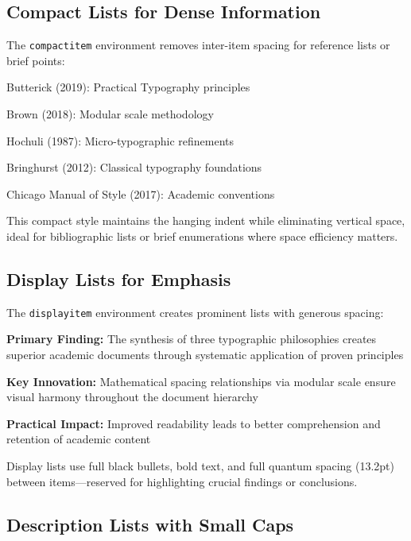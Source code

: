 \documentclass[11pt]{article}
\begin{document}
\subsection{Compact Lists for Dense Information}

The \texttt{compactitem} environment removes inter-item spacing for reference lists or brief points:

\begin{compactitem}
\item Butterick (2019): Practical Typography principles
\item Brown (2018): Modular scale methodology  
\item Hochuli (1987): Micro-typographic refinements
\item Bringhurst (2012): Classical typography foundations
\item Chicago Manual of Style (2017): Academic conventions
\end{compactitem}

This compact style maintains the hanging indent while eliminating vertical space, ideal for bibliographic lists or brief enumerations where space efficiency matters.

\subsection{Display Lists for Emphasis}

The \texttt{displayitem} environment creates prominent lists with generous spacing:

\begin{displayitem}
\item \textbf{Primary Finding:} The synthesis of three typographic philosophies creates superior academic documents through systematic application of proven principles
\item \textbf{Key Innovation:} Mathematical spacing relationships via modular scale ensure visual harmony throughout the document hierarchy
\item \textbf{Practical Impact:} Improved readability leads to better comprehension and retention of academic content
\end{displayitem}

Display lists use full black bullets, bold text, and full quantum spacing (13.2pt) between items—reserved for highlighting crucial findings or conclusions.

\subsection{Description Lists with Small Caps}
\end{document}
